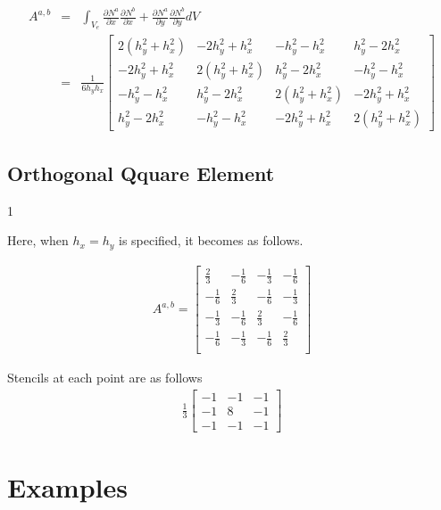 \begin{eqnarray}
A^{a,b}
&=&\int_{V_e}\frac{\partial N^a}{\partial x}\frac{\partial N^b}{\partial x}+\frac{\partial N^a}{\partial y}\frac{\partial N^b}{\partial y}dV \\
&=&\frac{1}{6h_yh_x}\left[\begin{array}{llll}                                         2(h_y^2+h_x^2) & -2h_y^2+h_x^2& -h_y^2-h_x^2 & h_y^2-2h_x^2\\                   -2h_y^2+h_x^2 & 2(h_y^2+h_x^2) & h_y^2-2h_x^2 & -h_y^2-h_x^2\\                  -h_y^2-h_x^2 & h_y^2-2h_x^2 & 2(h_y^2+h_x^2) & -2h_y^2+h_x^2\\                  h_y^2-2h_x^2 & -h_y^2-h_x^2 & -2h_y^2+h_x^2 & 2(h_y^2+h_x^2)\end{array}\right]
\end{eqnarray}



\subsection{Orthogonal Qquare Element}1

Here, when $h_x=h_y$ is specified, it becomes as follows.

\begin{eqnarray}
A^{a,b}=\left[\begin{array}{cccc}\frac{2}{3}&-\frac{1}{6}&-\frac{1}{3}&-\frac{1}{6}\\        -\frac{1}{6}&\frac{2}{3}&-\frac{1}{6}&-\frac{1}{3}\\        -\frac{1}{3}&-\frac{1}{6}&\frac{2}{3}&-\frac{1}{6}\\        -\frac{1}{6}&-\frac{1}{3}&-\frac{1}{6}&\frac{2}{3}\\ \end{array}\right]
\end{eqnarray}


Stencils at each point are as follows
%
\begin{eqnarray}
\frac{1}{3}\left[\begin{array}{ccc}-1&-1&-1\\-1&8&-1\\-1&-1&-1\end{array}\right]
\end{eqnarray}



\section{Examples}

